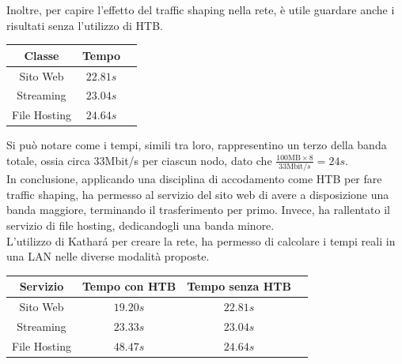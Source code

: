 Inoltre, per capire l'effetto del traffic shaping nella rete, è utile guardare anche i risultati senza l'utilizzo di HTB.
\begin{center}
  \begin{tabular}{ |c|c|c| }
    \hline
    \textbf{Classe} & \textbf{Tempo} \\
    \hline
    Sito Web & $22.81s$ \\
    \hline
    Streaming & $23.04s$ \\
    \hline
    File Hosting & $24.64s$ \\
    \hline
  \end{tabular}
\end{center}
Si può notare come i tempi, simili tra loro, rappresentino un terzo della banda totale, ossia circa 33Mbit/s per ciascun nodo, 
dato che $\frac{100 \text{MB} \times 8}{33 \text{Mbit}/s} = 24s$. \\
\vspace*{0.01\textheight}
In conclusione, applicando una disciplina di accodamento come HTB per fare traffic shaping,
ha permesso al servizio del sito web di avere a disposizione una banda maggiore, terminando il trasferimento per primo. 
Invece, ha rallentato il servizio di file hosting, dedicandogli una banda minore. \\
L'utilizzo di Kathará per creare la rete, ha permesso di calcolare i tempi reali in una LAN nelle diverse modalità proposte.
\begin{center}
  \begin{tabular}{ |c|c|c|c| }
    \hline
    \textbf{Servizio} & \textbf{Tempo con HTB} & \textbf{Tempo senza HTB}\\
    \hline
    Sito Web & $19.20s$ & $22.81s$ \\
    \hline
    Streaming & $23.33s$ & $23.04s$ \\
    \hline
    File Hosting & $48.47s$ & $24.64s$ \\
    \hline
  \end{tabular}
\end{center}

\newpage
